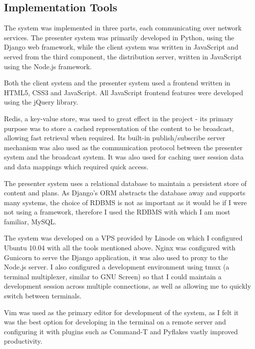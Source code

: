 \documentclass[a4papert,11pt,notitlepage]{ltxdoc}
\begin{document}
\subsection{Implementation Tools}
The system was implemented in three parts, each communicating over network services. The presenter system was primarily developed in Python\cite{python:web}, using the Django\cite{django:web} web framework, while the client system was written in JavaScript and served from the third component, the distribution server, written in JavaScript using the Node.js\cite{nodejs:web} framework.

Both the client system and the presenter system used a frontend written in HTML5, CSS3 and JavaScript. All JavaScript frontend features were developed using the jQuery\cite{jquery:web} library.

Redis\cite{redis:web}, a key-value store, was used to great effect in the project - its primary purpose was to store a cached representation of the content to be broadcast, allowing fast retrieval when required. Its built-in publish/subscribe server mechanism was also used as the communication protocol between the presenter system and the broadcast system. It was also used for caching user session data and data mappings which required quick access.

The presenter system uses a relational database to maintain a persistent store of content and plans. As Django's ORM abstracts the database away and supports many systems, the choice of RDBMS is not as important as it would be if I were not using a framework, therefore I used the RDBMS with which I am most familiar, MySQL\cite{mysql:web}.

The system was developed on a VPS provided by Linode on which I configured Ubuntu 10.04 with all the tools mentioned above. Nginx\cite{nginx:web} was configured with Gunicorn\cite{gunicorn:web} to serve the Django application, it was also used to proxy to the Node.js server. I also configured a development environment using tmux\cite{tmux:web} (a terminal multiplexer, similar to GNU Screen) so that I could maintain a development session across multiple connections, as well as allowing me to quickly switch between terminals.

Vim\cite{vim:web} was used as the primary editor for development of the system, as I felt it was the best option for developing in the terminal on a remote server and configuring it with plugins such as Command-T and Pyflakes vastly improved productivity.
\end{document}
